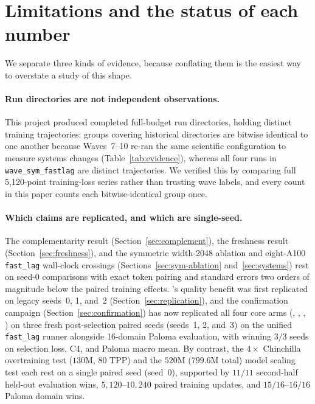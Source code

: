 \section{Limitations and the status of each number}
\label{sec:limitations}

We separate three kinds of evidence, because conflating them is the easiest way
to overstate a study of this shape.

\paragraph{Run directories are not independent observations.}
This project produced \nRunDirs{} completed full-budget run directories, holding
\nDistinctRuns{} distinct training trajectories: \nDuplicateGroups{} groups
covering \nDuplicateDirs{} historical directories are bitwise identical to one
another because Waves~7--10 re-ran the same scientific configuration to measure
systems changes (Table~\ref{tab:evidence}), whereas all four runs in
\texttt{wave\_sym\_fastlag} are distinct trajectories. We verified this by
comparing full 5{,}120-point training-loss series rather than trusting wave
labels, and every count in this paper counts each bitwise-identical group once.

\begin{table}[t]
\centering
\caption{Bitwise-identical run groups across Waves~7--10. Each group is one
trajectory recorded under several wave labels while systems changes were
measured around it; the recorded losses agree at all 5{,}120 updates.}
\label{tab:evidence}
\footnotesize\setlength{\tabcolsep}{6.0pt}

\end{table}

\paragraph{Which claims are replicated, and which are single-seed.}
The complementarity result (Section~\ref{sec:complement}), the freshness result
(Section~\ref{sec:freshness}), and the symmetric width-2048 ablation and
eight-A100 \texttt{fast\_lag} wall-clock crossings
(Sections~\ref{sec:sym-ablation} and~\ref{sec:systems}) rest on seed-0
comparisons with exact token pairing and standard errors two orders of magnitude
below the paired training effects. 's quality benefit was first
replicated on legacy seeds~0, 1, and~2 (Section~\ref{sec:replication}), and the
confirmation campaign (Section~\ref{sec:confirmation}) has now replicated all
four core arms (, , ,
) on three fresh post-selection paired seeds (seeds~1, 2,
and~3) on the unified \texttt{fast\_lag} runner alongside 16-domain Paloma
evaluation, with  winning $3/3$ seeds on selection loss, C4,
and Paloma macro mean. By contrast, the $4\times$ Chinchilla overtraining test
($130\text{M}$, $80$ TPP) and the $520\text{M}$ ($799.6\text{M}$ total) model
scaling test each rest on a single paired seed (seed~0), supported by $11/11$
second-half held-out evaluation wins, $5{,}120$--$10{,}240$ paired training
updates, and $15/16$--$16/16$ Paloma domain wins.

